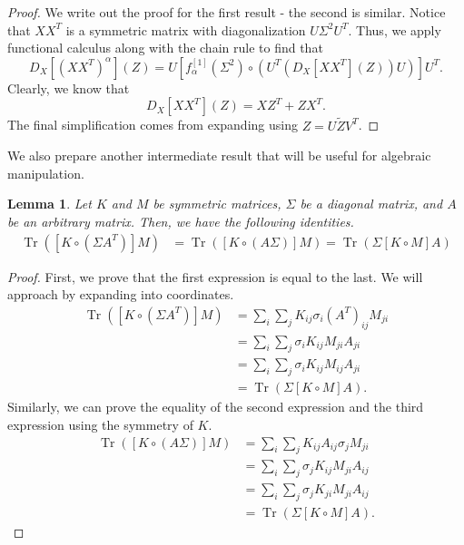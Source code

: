 \documentclass{amsart}
\DeclareMathOperator{\Tr}{Tr}
\newtheorem{lemma}[theorem]{Lemma}
\theoremstyle{definition}
\theoremstyle{remark}
\numberwithin{equation}{section}
\begin{document}
\begin{proof}
    We write out the proof for the first result - the second is similar. Notice that $XX^T$ is a symmetric matrix with diagonalization $U\Sigma^2U^T$. Thus, we apply functional calculus along with the chain rule to find that 
    \begin{equation}
        D_X\left[\left(XX^T\right)^\alpha\right](Z) = U\left[f_\alpha^{[1]}\left(\Sigma^2\right) \circ \left( U^T\left(D_X\left[XX^T\right](Z) \right)U\right)\right] U^T.
    \end{equation}
    Clearly, we know that 
    \begin{equation}
        D_X\left[XX^T\right](Z) = XZ^T + ZX^T.
    \end{equation}
    The final simplification comes from expanding using $Z = U \tilde{Z} V^T$.
\end{proof}

We also prepare another intermediate result that will be useful for algebraic manipulation.
\begin{lemma}\label{lem:some_trace_identities}
    Let $K$ and $M$ be symmetric matrices, $\Sigma$ be a diagonal matrix, and $A$ be an arbitrary matrix. Then, we have the following identities.
    \begin{align}
        \Tr([K \circ (\Sigma A^T)]M) &= \Tr([K \circ (A\Sigma)]M) = \Tr(\Sigma[K \circ M] A)
    \end{align}
\end{lemma}
\begin{proof}
    First, we prove that the first expression is equal to the last. We will approach by expanding into coordinates.
    \begin{align}
        \Tr([K \circ (\Sigma A^T)] M) &= \sum_{i} \sum_j K_{ij}\sigma_i(A^T)_{ij}M_{ji}\nonumber\\
        &= \sum_{i} \sum_{j} \sigma_iK_{ij}M_{ji} A_{ji} \nonumber\\
        &= \sum_i \sum_j \sigma_i K_{ij} M_{ij} A_{ji} \nonumber\\
        &= \Tr(\Sigma [K\circ M] A).
    \end{align}
    Similarly, we can prove the equality of the second expression and the third expression using the symmetry of $K$.
    \begin{align}
        \Tr([K \circ (A\Sigma)] M) &= \sum_{i} \sum_j K_{ij}A_{ij}\sigma_jM_{ji}\nonumber\\
        &= \sum_i \sum_j \sigma_jK_{ij}M_{ji} A_{ij} \nonumber
        \\
        &= \sum_i \sum_j \sigma_j K_{ji} M_{ji} A_{ij} \nonumber \\
        &= \Tr(\Sigma [K\circ M] A).
    \end{align}
\end{proof}
\end{document}
